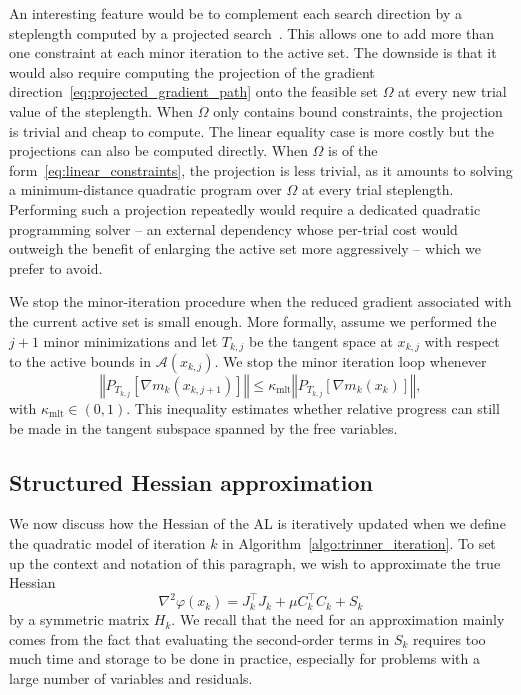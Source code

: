 \documentclass{article}
\numberwithin{equation}{section}
\newcommand{\calA}{{\mathcal{A}}}
\newcommand{\proj}[2]{P_{#1} \left[ {#2} \right]} %
\theoremstyle{plain}
\begin{document}
An interesting feature would be to complement each search direction by a steplength computed by a projected search~\cite{moretoraldo:1991,linmore:1999a}. This allows one to add more than one constraint at each minor iteration to the active set. The downside is that it would also require computing the projection of the gradient direction~\eqref{eq:projected_gradient_path} onto the feasible set $\Omega$ at every new trial value of the steplength. When $\Omega$ only contains bound constraints, the projection is trivial and cheap to compute. The linear equality case is more costly but the projections can also be computed directly. When $\Omega$ is of the form~\eqref{eq:linear_constraints}, the projection is less trivial, as it amounts to solving a minimum-distance quadratic program over $\Omega$ at every trial steplength. Performing such a projection repeatedly would require a dedicated quadratic programming solver -- an external dependency whose per-trial cost would outweigh the benefit of enlarging the active set more aggressively -- which we prefer to avoid.

We stop the minor-iteration procedure when the reduced gradient associated with the current active set is small enough. More formally, assume we performed the $j+1$ minor minimizations and let $T_{k,j}$ be the tangent space at $x_{k,j}$ with respect to the active bounds in $\calA(x_{k,j})$. We stop the minor iteration loop whenever
\begin{equation*}
	\left\Vert \proj{T_{k,j}}{\nabla m_k(x_{k,j+1})} \right\Vert \le \kappa_{\mathrm{mlt}} \left\Vert \proj{T_{k,j}}{\nabla m_k(x_k)}\right\Vert,
\end{equation*}
with $\kappa_{\mathrm{mlt}} \in (0,1)$. This inequality estimates whether relative progress can still be made in the tangent subspace spanned by the free variables. 

	\subsection{Structured Hessian approximation}\label{subsec:hessian_approx}

We now discuss how the Hessian of the AL is iteratively updated when we define the quadratic model of iteration $k$ in Algorithm~\ref{algo:trinner_iteration}. To set up the context and notation of this paragraph, we wish to approximate the true Hessian
\[\nabla^2 \varphi(x_k) = J_k^\top J_k + \mu C_k^\top C_k + S_k\]  
by a symmetric matrix $H_k$.
We recall that the need for an approximation mainly comes from the fact that evaluating the second-order terms in $S_k$ requires too much time and storage to be done in practice, especially for problems with a large number of variables and residuals.
\end{document}
